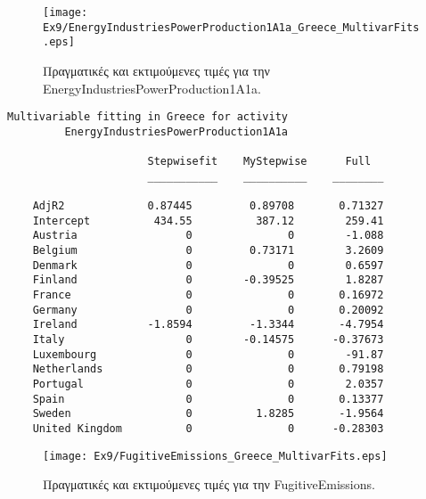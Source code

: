 \documentclass[11pt]{scrartcl} %
\begin{document}
\begin{figure}[H]

	\centering
	\texttt{[image: Ex9/EnergyIndustriesPowerProduction1A1a\_Greece\_MultivarFits.eps]}	
\caption{Πραγματικές και εκτιμούμενες τιμές για την EnergyIndustriesPowerProduction1A1a.}
\label{fig:z93} 
\end{figure}



\begin{Verbatim}[fontsize=\small]
Multivariable fitting in Greece for activity
 	 	 EnergyIndustriesPowerProduction1A1a

                      Stepwisefit    MyStepwise      Full  
                      ___________    __________    ________

    AdjR2             0.87445         0.89708       0.71327
    Intercept          434.55          387.12        259.41
    Austria                 0               0        -1.088
    Belgium                 0         0.73171        3.2609
    Denmark                 0               0        0.6597
    Finland                 0        -0.39525        1.8287
    France                  0               0       0.16972
    Germany                 0               0       0.20092
    Ireland           -1.8594         -1.3344       -4.7954
    Italy                   0        -0.14575      -0.37673
    Luxembourg              0               0        -91.87
    Netherlands             0               0       0.79198
    Portugal                0               0        2.0357
    Spain                   0               0       0.13377
    Sweden                  0          1.8285       -1.9564
    United Kingdom          0               0      -0.28303
\end{Verbatim}


\begin{figure}[H]
 
	\centering
	\texttt{[image: Ex9/FugitiveEmissions\_Greece\_MultivarFits.eps]}	
\caption{Πραγματικές και εκτιμούμενες τιμές για την FugitiveEmissions.}
\label{fig:z94}
\end{figure}
\end{document}
